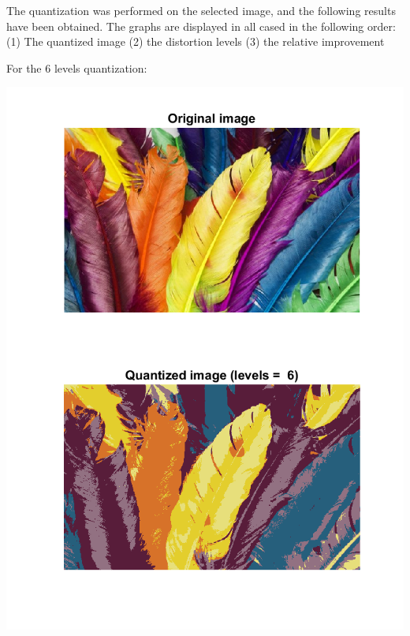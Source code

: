 \documentclass[a4paper]{iacas}
\begin{document}
\subsubsection{}
The quantization was performed on the selected image, and the following results have been obtained. The graphs are displayed in all cased in the following order: (1) The quantized image (2) the distortion levels (3) the relative improvement

For the 6 levels quantization:

\vskip 0.1in
\begin{minipage}{1\textwidth}
\centering
	\includegraphics[scale=0.9]{../imgs/imgs_q4/q4_quantized_levels_6_init_1.png}
\end{minipage}
\vskip 0.1in
\end{document}
